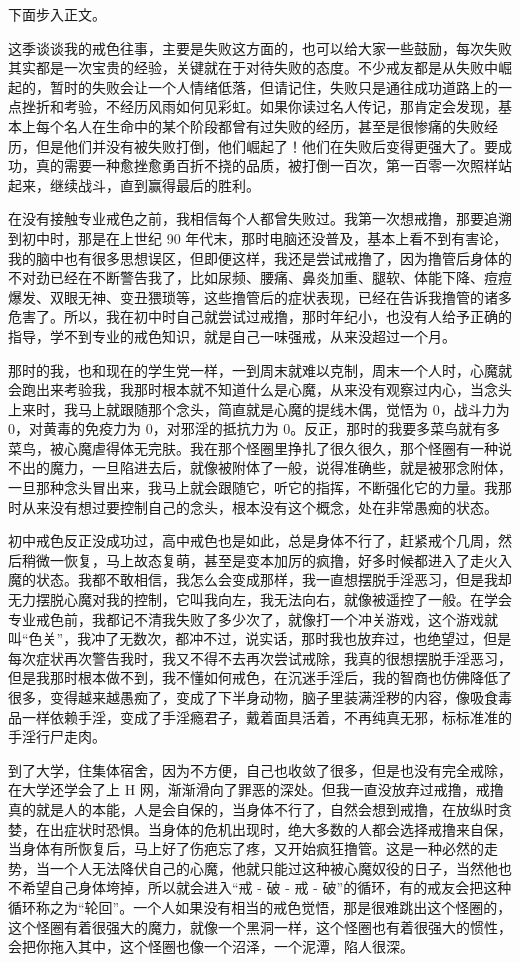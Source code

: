 下面步入正文。

这季谈谈我的戒色往事，主要是失败这方面的，也可以给大家一些鼓励，每次失败其实都是一次宝贵的经验，关键就在于对待失败的态度。不少戒友都是从失败中崛起的，暂时的失败会让一个人情绪低落，但请记住，失败只是通往成功道路上的一点挫折和考验，不经历风雨如何见彩虹。如果你读过名人传记，那肯定会发现，基本上每个名人在生命中的某个阶段都曾有过失败的经历，甚至是很惨痛的失败经历，但是他们并没有被失败打倒，他们崛起了！他们在失败后变得更强大了。要成功，真的需要一种愈挫愈勇百折不挠的品质，被打倒一百次，第一百零一次照样站起来，继续战斗，直到赢得最后的胜利。

在没有接触专业戒色之前，我相信每个人都曾失败过。我第一次想戒撸，那要追溯到初中时，那是在上世纪 90 年代末，那时电脑还没普及，基本上看不到有害论，我的脑中也有很多思想误区，但即便这样，我还是尝试戒撸了，因为撸管后身体的不对劲已经在不断警告我了，比如尿频、腰痛、鼻炎加重、腿软、体能下降、痘痘爆发、双眼无神、变丑猥琐等，这些撸管后的症状表现，已经在告诉我撸管的诸多危害了。所以，我在初中时自己就尝试过戒撸，那时年纪小，也没有人给予正确的指导，学不到专业的戒色知识，就是自己一味强戒，从来没超过一个月。

那时的我，也和现在的学生党一样，一到周末就难以克制，周末一个人时，心魔就会跑出来考验我，我那时根本就不知道什么是心魔，从来没有观察过内心，当念头上来时，我马上就跟随那个念头，简直就是心魔的提线木偶，觉悟为 0，战斗力为 0，对黄毒的免疫力为 0，对邪淫的抵抗力为 0。反正，那时的我要多菜鸟就有多菜鸟，被心魔虐得体无完肤。我在那个怪圈里挣扎了很久很久，那个怪圈有一种说不出的魔力，一旦陷进去后，就像被附体了一般，说得准确些，就是被邪念附体，一旦那种念头冒出来，我马上就会跟随它，听它的指挥，不断强化它的力量。我那时从来没有想过要控制自己的念头，根本没有这个概念，处在非常愚痴的状态。

初中戒色反正没成功过，高中戒色也是如此，总是身体不行了，赶紧戒个几周，然后稍微一恢复，马上故态复萌，甚至是变本加厉的疯撸，好多时候都进入了走火入魔的状态。我都不敢相信，我怎么会变成那样，我一直想摆脱手淫恶习，但是我却无力摆脱心魔对我的控制，它叫我向左，我无法向右，就像被遥控了一般。在学会专业戒色前，我都记不清我失败了多少次了，就像打一个冲关游戏，这个游戏就叫“色关”，我冲了无数次，都冲不过，说实话，那时我也放弃过，也绝望过，但是每次症状再次警告我时，我又不得不去再次尝试戒除，我真的很想摆脱手淫恶习，但是我那时根本做不到，我不懂如何戒色，在沉迷手淫后，我的智商也仿佛降低了很多，变得越来越愚痴了，变成了下半身动物，脑子里装满淫秽的内容，像吸食毒品一样依赖手淫，变成了手淫瘾君子，戴着面具活着，不再纯真无邪，标标准准的手淫行尸走肉。

到了大学，住集体宿舍，因为不方便，自己也收敛了很多，但是也没有完全戒除，在大学还学会了上 H 网，渐渐滑向了罪恶的深处。但我一直没放弃过戒撸，戒撸真的就是人的本能，人是会自保的，当身体不行了，自然会想到戒撸，在放纵时贪婪，在出症状时恐惧。当身体的危机出现时，绝大多数的人都会选择戒撸来自保，当身体有所恢复后，马上好了伤疤忘了疼，又开始疯狂撸管。这是一种必然的走势，当一个人无法降伏自己的心魔，他就只能过这种被心魔奴役的日子，当然他也不希望自己身体垮掉，所以就会进入“戒 - 破 - 戒 - 破”的循环，有的戒友会把这种循环称之为“轮回”。一个人如果没有相当的戒色觉悟，那是很难跳出这个怪圈的，这个怪圈有着很强大的魔力，就像一个黑洞一样，这个怪圈也有着很强大的惯性，会把你拖入其中，这个怪圈也像一个沼泽，一个泥潭，陷人很深。

